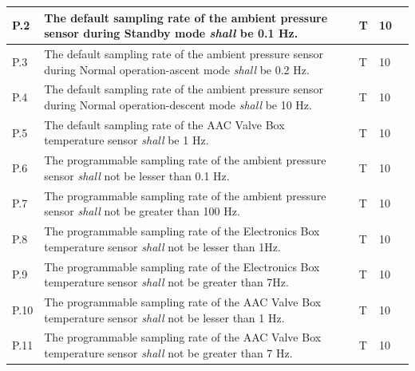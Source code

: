 \documentclass[a4paper,12pt,twoside]{article}
\begin{document}
\begin{longtable}[]{|m{}| m{} |m{} |m{}|m{}|}
P.2  & The default sampling rate of the ambient pressure sensor during Standby mode \textit{shall} be 0.1 Hz.                                                                           &      T        & 10            &        \\ \hline
P.3  & The default sampling rate of the ambient pressure sensor during Normal operation-ascent mode \textit{shall} be 0.2 Hz.                                                           &      T        & 10            &        \\ \hline
P.4  & The default sampling rate of the ambient pressure sensor during Normal operation-descent mode \textit{shall} be 10 Hz.                                                           &       T       & 10            &        \\ \hline
P.5  & The default sampling rate of the AAC Valve Box temperature sensor \textit{shall} be 1 Hz.                                                                                        &      T        & 10            &        \\ \hline
P.6  & The programmable sampling rate of the ambient pressure sensor \textit{shall} not be lesser than 0.1 Hz.                                                                          &      T        & 10            &        \\ \hline
P.7  & The programmable sampling rate of the ambient pressure sensor \textit{shall} not be greater than 100 Hz.                                                                         &       T       & 10            &        \\ \hline
P.8  & The programmable sampling rate of the Electronics Box temperature sensor \textit{shall} not be lesser than 1Hz.                                                                          &       T       & 10            &        \\ \hline
P.9  & The programmable sampling rate of the Electronics Box temperature sensor \textit{shall} not be greater than 7Hz.                                                                         &        T      & 10            &        \\ \hline
P.10 & The programmable sampling rate of the AAC Valve Box temperature sensor \textit{shall} not be lesser than 1 Hz.                                                                   &        T      & 10            &        \\ \hline
P.11 & The programmable sampling rate of the AAC Valve Box temperature sensor \textit{shall} not be greater than 7 Hz.                                                                  &        T      & 10            &        \\ \hline

\end{longtable}
\end{document}
